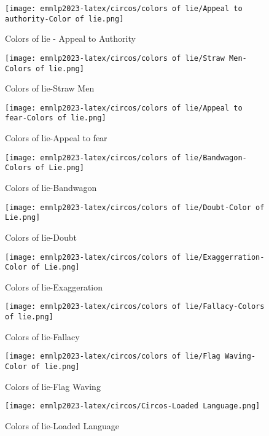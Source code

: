 \begin{figure*}[htbp]
    \begin{subfigure}[b]{0.33\textwidth}
    \centering
        \texttt{[image: emnlp2023-latex/circos/colors of lie/Appeal to authority-Color of lie.png]}
        \caption{Colors of lie - Appeal to Authority}
    \end{subfigure}
    \begin{subfigure}[b]{0.33\textwidth}
    \centering
        \texttt{[image: emnlp2023-latex/circos/colors of lie/Straw Men-Colors of lie.png]}
        \caption{Colors of lie-Straw Men}
    \end{subfigure}    
    \begin{subfigure}[b]{0.33\textwidth}
    \centering
        \texttt{[image: emnlp2023-latex/circos/colors of lie/Appeal to fear-Colors of lie.png]}
        \caption{Colors of lie-Appeal to fear}
    \end{subfigure}
    \begin{subfigure}[b]{0.33\textwidth}
    \centering
        \texttt{[image: emnlp2023-latex/circos/colors of lie/Bandwagon-Colors of Lie.png]}
        \caption{Colors of lie-Bandwagon}
    \end{subfigure}
    \begin{subfigure}[b]{0.33\textwidth}
    \centering
        \texttt{[image: emnlp2023-latex/circos/colors of lie/Doubt-Color of Lie.png]}
        \caption{Colors of lie-Doubt}
    \end{subfigure}
    \begin{subfigure}[b]{0.33\textwidth}
    \centering
        \texttt{[image: emnlp2023-latex/circos/colors of lie/Exaggerration- Color of Lie.png]}
        \caption{Colors of lie-Exaggeration}
    \end{subfigure}
    \begin{subfigure}[b]{0.33\textwidth}
    \centering
        \texttt{[image: emnlp2023-latex/circos/colors of lie/Fallacy-Colors of lie.png]}
        \caption{Colors of lie-Fallacy}
    \end{subfigure}
    \begin{subfigure}[b]{0.33\textwidth}
    \centering
        \texttt{[image: emnlp2023-latex/circos/colors of lie/Flag Waving-Color of lie.png]}
        \caption{Colors of lie-Flag Waving}
    \end{subfigure}
    \begin{subfigure}[b]{0.33\textwidth}
    \centering
        \texttt{[image: emnlp2023-latex/circos/Circos-Loaded Language.png]}
        \caption{Colors of lie-Loaded Language}
    \end{subfigure}
\end{figure*}


